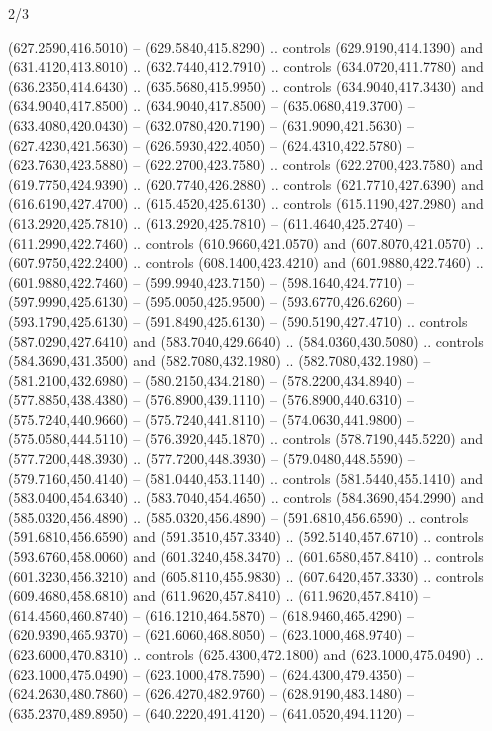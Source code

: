 \begin{flagdescription}{2/3}
\begin{scope}[xshift=0.5\flaglength,yshift=0.5\flagwidth,scale=\flagwidth/638.38]
\begin{scope}[y=0.80pt, x=0.80pt, yscale=-1,shift={(-600,-400)}]
\begin{scope}[shift={(-0.02,2.173)}]
  (627.2590,416.5010) -- (629.5840,415.8290) .. controls (629.9190,414.1390) and
  (631.4120,413.8010) .. (632.7440,412.7910) .. controls (634.0720,411.7780) and
  (636.2350,414.6430) .. (635.5680,415.9950) .. controls (634.9040,417.3430) and
  (634.9040,417.8500) .. (634.9040,417.8500) -- (635.0680,419.3700) --
  (633.4080,420.0430) -- (632.0780,420.7190) -- (631.9090,421.5630) --
  (627.4230,421.5630) -- (626.5930,422.4050) -- (624.4310,422.5780) --
  (623.7630,423.5880) -- (622.2700,423.7580) .. controls (622.2700,423.7580) and
  (619.7750,424.9390) .. (620.7740,426.2880) .. controls (621.7710,427.6390) and
  (616.6190,427.4700) .. (615.4520,425.6130) .. controls (615.1190,427.2980) and
  (613.2920,425.7810) .. (613.2920,425.7810) -- (611.4640,425.2740) --
  (611.2990,422.7460) .. controls (610.9660,421.0570) and (607.8070,421.0570) ..
  (607.9750,422.2400) .. controls (608.1400,423.4210) and (601.9880,422.7460) ..
  (601.9880,422.7460) -- (599.9940,423.7150) -- (598.1640,424.7710) --
  (597.9990,425.6130) -- (595.0050,425.9500) -- (593.6770,426.6260) --
  (593.1790,425.6130) -- (591.8490,425.6130) -- (590.5190,427.4710) .. controls
  (587.0290,427.6410) and (583.7040,429.6640) .. (584.0360,430.5080) .. controls
  (584.3690,431.3500) and (582.7080,432.1980) .. (582.7080,432.1980) --
  (581.2100,432.6980) -- (580.2150,434.2180) -- (578.2200,434.8940) --
  (577.8850,438.4380) -- (576.8900,439.1110) -- (576.8900,440.6310) --
  (575.7240,440.9660) -- (575.7240,441.8110) -- (574.0630,441.9800) --
  (575.0580,444.5110) -- (576.3920,445.1870) .. controls (578.7190,445.5220) and
  (577.7200,448.3930) .. (577.7200,448.3930) -- (579.0480,448.5590) --
  (579.7160,450.4140) -- (581.0440,453.1140) .. controls (581.5440,455.1410) and
  (583.0400,454.6340) .. (583.7040,454.4650) .. controls (584.3690,454.2990) and
  (585.0320,456.4890) .. (585.0320,456.4890) -- (591.6810,456.6590) .. controls
  (591.6810,456.6590) and (591.3510,457.3340) .. (592.5140,457.6710) .. controls
  (593.6760,458.0060) and (601.3240,458.3470) .. (601.6580,457.8410) .. controls
  (601.3230,456.3210) and (605.8110,455.9830) .. (607.6420,457.3330) .. controls
  (609.4680,458.6810) and (611.9620,457.8410) .. (611.9620,457.8410) --
  (614.4560,460.8740) -- (616.1210,464.5870) -- (618.9460,465.4290) --
  (620.9390,465.9370) -- (621.6060,468.8050) -- (623.1000,468.9740) --
  (623.6000,470.8310) .. controls (625.4300,472.1800) and (623.1000,475.0490) ..
  (623.1000,475.0490) -- (623.1000,478.7590) -- (624.4300,479.4350) --
  (624.2630,480.7860) -- (626.4270,482.9760) -- (628.9190,483.1480) --
  (635.2370,489.8950) -- (640.2220,491.4120) -- (641.0520,494.1120) --

\end{scope}
\end{scope}
\end{scope}
\end{flagdescription}
